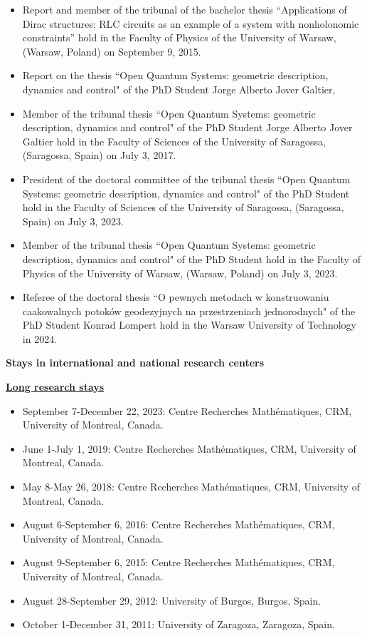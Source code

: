 \documentclass[12pt,reqno]{amsbook}
\begin{document}
\begin{itemize}
        \item Report and member of the tribunal of the bachelor thesis ``Applications of Dirac structures: RLC circuits as an example of a system with nonholonomic constraints'' hold in the Faculty of Physics of the University of Warsaw, (Warsaw, Poland) on September 9, 2015.
        \item Report on the thesis ``Open Quantum Systems: geometric description, dynamics and control" of the PhD Student Jorge Alberto Jover Galtier,
        \item Member of the tribunal thesis ``Open Quantum Systems: geometric description, dynamics and control" of the PhD Student Jorge Alberto Jover Galtier hold in the Faculty of Sciences of the University of Saragossa, (Saragossa, Spain) on July 3, 2017.
        \item President of the doctoral committee of the tribunal thesis ``Open Quantum Systems: geometric description, dynamics and control" of the PhD Student   hold in the Faculty of Sciences of the University of Saragossa, (Saragossa, Spain) on July 3, 2023.
        \item Member of the tribunal thesis ``Open Quantum Systems: geometric description, dynamics and control" of the PhD Student   hold in the Faculty of Physics of the University of Warsaw, (Warsaw, Poland) on July 3, 2023.
        \item Referee of the  doctoral thesis ``O pewnych metodach w konstruowaniu caakowalnych potoków geodezyjnych na przestrzeniach jednorodnych" of the PhD Student  Konrad Lompert hold in the Warsaw University of Technology in 2024.
        \end{itemize}

\vskip 0.5cm
{\bf Stays in international and national research centers}
\vskip 0.5cm

 \centerline{\bf \underline{Long research stays}}
\vskip 0.5cm
 \begin{itemize}
   \item September 7-December 22, 2023: Centre Recherches Math\'ematiques, CRM, University of Montreal, Canada.
  \item June 1-July 1, 2019: Centre Recherches Math\'ematiques, CRM, University of Montreal, Canada.
   \item May 8-May 26, 2018: Centre Recherches Math\'ematiques, CRM, University of Montreal, Canada.
 \item August 6-September 6, 2016: Centre Recherches Math\'ematiques, CRM, University of Montreal, Canada.
 \item August 9-September 6, 2015: Centre Recherches Math\'ematiques, CRM, University of Montreal, Canada.
 \item August 28-September 29, 2012: University of Burgos, Burgos, Spain. 
 \item October 1-December 31, 2011: University of Zaragoza, Zaragoza, Spain. 
  \end{itemize}
  \vskip 0.5cm
\end{document}
